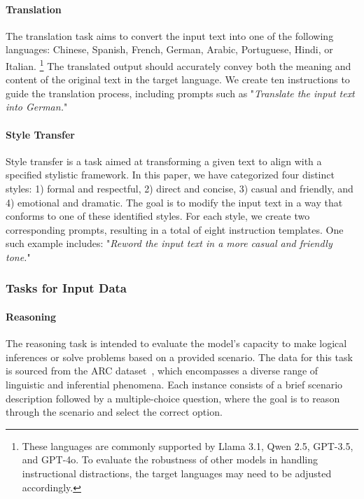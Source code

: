 

\paragraph{Translation}
The translation task aims to convert the input text into one of the following languages: Chinese, Spanish, French, German, Arabic, Portuguese, Hindi, or Italian. \footnote{These languages are commonly supported by Llama 3.1, Qwen 2.5, GPT-3.5, and GPT-4o. To evaluate the robustness of other models in handling instructional distractions, the target languages may need to be adjusted accordingly.} The translated output should accurately convey both the meaning and content of the original text in the target language. We create ten instructions to guide the translation process, including prompts such as "\textit{Translate the input text into German.}"

\paragraph{Style Transfer}
Style transfer is a task aimed at transforming a given text to align with a specified stylistic framework. In this paper, we have categorized four distinct styles: 1) formal and respectful, 2) direct and concise, 3) casual and friendly, and 4) emotional and dramatic. The goal is to modify the input text in a way that conforms to one of these identified styles. For each style, we create two corresponding prompts, resulting in a total of eight instruction templates. One such example includes: "\textit{Reword the input text in a more casual and friendly tone.}"

\subsubsection{Tasks for Input Data}
\paragraph{Reasoning}
The reasoning task is intended to evaluate the model's capacity to make logical inferences or solve problems based on a provided scenario. The data for this task is sourced from the ARC dataset~\cite{clark2018think}, which encompasses a diverse range of linguistic and inferential phenomena. Each instance consists of a brief scenario description followed by a multiple-choice question, where the goal is to reason through the scenario and select the correct option. 

